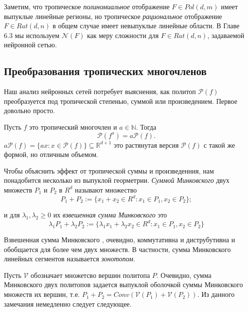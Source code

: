 \documentclass[russian]{lecture-notes}
\begin{document}
	Заметим, что тропическое \textit{полиномиальное} отображение $F \in Pol(d, m)$ имеет выпуклые линейные регионы, но тропическое \textit{рациональное} отображение $F \in Rat(d, n)$ в общем случае имеет невыпуклые линейные области. В Главе 6.3 мы используем $\mathcal{N}(F)$ как меру сложности для $F \in Rat(d, n)$, задаваемой нейронной сетью.
	
	\subsection{Преобразования тропических многочленов}
	Наш анализ нейронных сетей потребует выяснения, как политоп $\mathcal{P}(f)$ преобразуется под тропической степенью, суммой или произведением. Первое довольно просто.
	
	\begin{Proposition}
		Пусть $f$ это тропический многочлен и $a \in \mathbb{N}$. Тогда
		\begin{equation*}
			\mathcal{P}(f^a) = a\mathcal{P}(f).
		\end{equation*}
		$a\mathcal{P}(f) = \{ax : x \in \mathcal{P}(f)\} \subseteq \mathbb{R}^{d+1}$ это растянутая версия $\mathcal{P}(f)$ с такой же формой, но отличным объемом.
	\end{Proposition}

	Чтобы объяснить эффект от тропической суммы и произведенния, нам понадобится несколько из выпуклой георметрии. \textit{Суммой Минковского} двух множеств $P_1$ и $P_2$ в $R^d$ называют множество
	\begin{equation*}
		P_1 + P_2 := \{x_1 + x_2 \in R^d : x_1 \in P_1, x_2 \in P_2\};
	\end{equation*} 
	
	и для $\lambda_1,\lambda_2 \geq 0$ их \textit{взвешенная сумма Минковского} это 
	\begin{equation*}
		\lambda_1P_1 + \lambda_2P_2 := \{\lambda_1x_1 + \lambda_2x_2 \in R^d : x_1 \in P_1, x_2 \in P_2\}
	\end{equation*}
	
	Взвешенная сумма Минковского , очевидно, коммутативна и диструбутивна и обобщается для более чем двух множеств. В частности, сумма Минковского линейных сегментов называется \textit{зонотопом}.
	
	Пусть $\mathcal{V}$ обозначает множетсво вершин политопа $P$. Очевидно, сумма Минковского двух политопов задается выпуклой оболочкой суммы Минковского множеств их вершин, т.е. $P_1 + P_2 = Conv(\mathcal{V}(P_1) + \mathcal{V}(P_2))$. Из данного замечания немедленно следует следующее.
	
\end{document}
